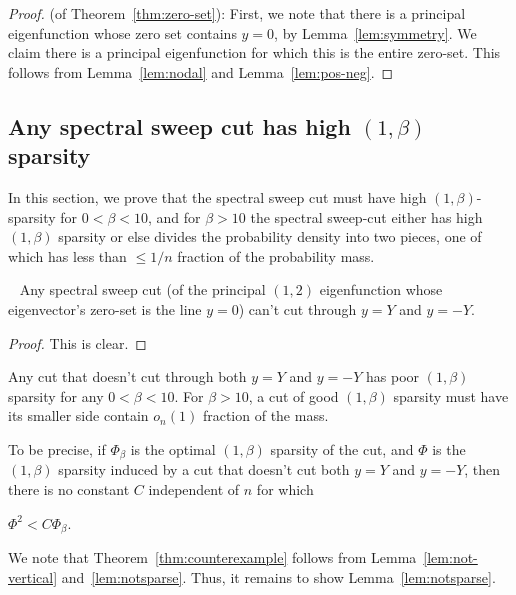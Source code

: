   \begin{proof} (of Theorem~\ref{thm:zero-set}):
    First, we note that there is a principal eigenfunction whose zero
    set contains $y = 0$, by Lemma~\ref{lem:symmetry}. We claim there is a principal
    eigenfunction for which this is the entire zero-set. This follows
    from Lemma~\ref{lem:nodal} and Lemma~\ref{lem:pos-neg}.
  \end{proof}


\subsection{Any spectral sweep cut has high $(1,\beta)$ sparsity}
In this section, we prove that the spectral sweep cut must have high $(1,\beta)$-sparsity
for $0 < \beta < 10$, and for $\beta>10$ the spectral sweep-cut either
has high $(1,\beta)$ sparsity or else divides the probability density
into two pieces, one of which has less than $\leq 1/n$ fraction
of the probability mass. 

\begin{lemma}~\label{lem:not-vertical} Any spectral sweep cut (of the principal $(1,2)$
  eigenfunction whose eigenvector's zero-set is the line $y = 0$) can't cut through $y=Y$ and $y =
  -Y$.
\end{lemma}
\begin{proof} 
  This is clear.
\end{proof}
\begin{lemma}\label{lem:notsparse} Any cut that doesn't cut through both $y=Y$ and $y=-Y$ has
  poor $(1,\beta)$ sparsity for any $0 < \beta < 10$. For $\beta > 10$,
  a cut of good $(1,\beta)$ sparsity must have its smaller side contain $o_n(1)$ fraction of the
  mass. 
  
  To be precise, if $\Phi_{\beta}$ is the optimal $(1,\beta)$
  sparsity of the cut, and $\Phi$ is the $(1,\beta)$ sparsity induced by
  a cut that doesn't cut both $y=Y$ and $y=-Y$, then there is no
  constant $C$ independent of $n$ for which

  $\Phi^2 <  C \Phi_\beta $.
\end{lemma}
We note that Theorem~\ref{thm:counterexample} follows from
Lemma~\ref{lem:not-vertical} and~\ref{lem:notsparse}. Thus, it remains
to show Lemma~\ref{lem:notsparse}.

